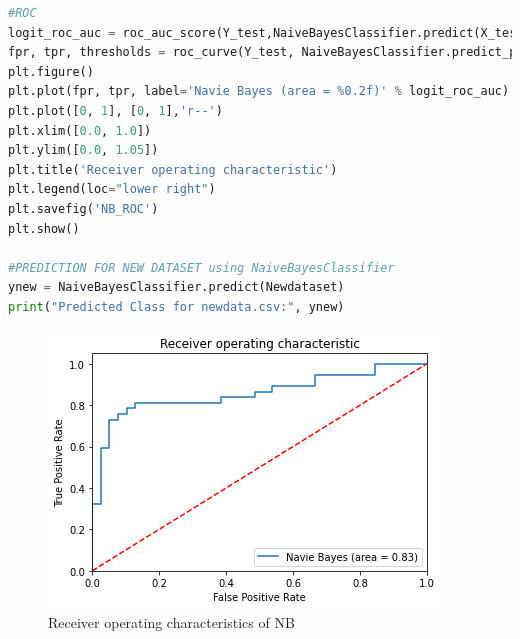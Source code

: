 \begin{lstlisting}[language=Python, label=list:python_code_ex]
#ROC
logit_roc_auc = roc_auc_score(Y_test,NaiveBayesClassifier.predict(X_test))
fpr, tpr, thresholds = roc_curve(Y_test, NaiveBayesClassifier.predict_proba(X_test)[:,1])
plt.figure()
plt.plot(fpr, tpr, label='Navie Bayes (area = %0.2f)' % logit_roc_auc)
plt.plot([0, 1], [0, 1],'r--')
plt.xlim([0.0, 1.0])
plt.ylim([0.0, 1.05])
plt.title('Receiver operating characteristic')
plt.legend(loc="lower right")
plt.savefig('NB_ROC')
plt.show()

#PREDICTION FOR NEW DATASET using NaiveBayesClassifier
ynew = NaiveBayesClassifier.predict(Newdataset)
print("Predicted Class for newdata.csv:", ynew)
\end{lstlisting}

\begin{figure}[H]
    \centering
    \includegraphics[width=0.4\linewidth]{NB.png}
    \caption{Receiver operating characteristics of NB}
    \label{fig:enter-label}
\end{figure}